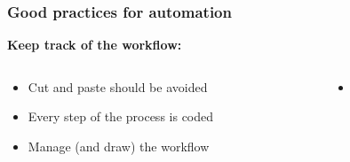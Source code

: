 \documentclass[xcolor=x11names,compress, aspectratio=169]{beamer}
\renewcommand{\(}{\begin{columns}}
\renewcommand{\)}{\end{columns}}
\newcommand{\<}[1]{\begin{column}{#1}}
\renewcommand{\>}{\end{column}}
\begin{document}
\begin{frame}
\frametitle{\textbf{Good practices for automation} }
\textcolor{siap}{\textbf{Keep track of the workflow:} \\  }
 \begin{columns}[t]
 \begin{column}{0.5\textwidth}
    \begin{itemize}[<+->]
     \item Cut and paste should be avoided
     \item Every step of the process is coded
     \item Manage (and draw) the workflow
   \end{itemize}
  \end{column}
 \begin{column}{0.5\textwidth}
    \begin{itemize}
        \item[]
    \end{itemize}
  \end{column}
\end{columns}
\end{frame}
\end{document}
